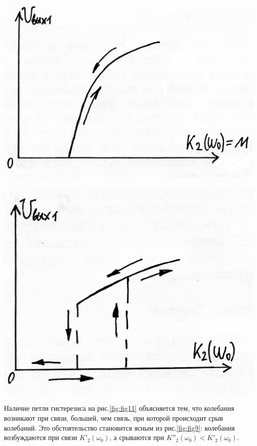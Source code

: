 \begin{center}
    \begin{minipage}{0.49\linewidth}
        \includegraphics[width=\linewidth]{circuit/fig10} 
        \label{fig:fig:10}
    \end{minipage}
\hfill     
    \begin{minipage}{0.49\linewidth}
        \centering
        \includegraphics[width=\linewidth]{circuit/fig11}  
        \label{fig:fig:11}
    \end{minipage} 
\end{center} 

Наличие петли гистерезиса на рис.\ref{fig:fig11} объясняется тем, что колебания возникают при связи, большей, чем связь, при которой происходит срыв колебаний. Это обстоятельство становится ясным из рис.\ref{fig:fig9}: колебания возбуждаются при связи $K'_2(\omega_0)$, а срываются при $K''_2(\omega_0)<K'_2(\omega_0)$.

